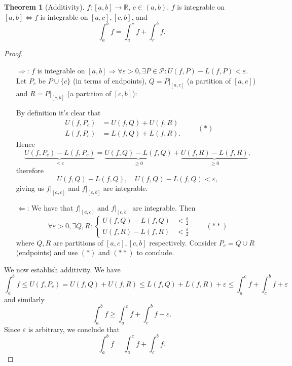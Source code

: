 \documentclass[a4paper]{article}
\theoremstyle{definition}
\newtheorem{thm}[defn]{Theorem}
\begin{document}
\begin{thm}[Additivity]
	$f:[a,b]\rightarrow \mathbb R$, $c\in (a,b)$. $f$ is integrable on $[a,b] \Leftrightarrow f$ is integrable on $[a,c],[c,b]$, and
\[
\int_a^b f = \int_a^c f + \int_c^b f .
\]
\end{thm}
\begin{proof}
	\begin{itemize}
		\item[$\Rightarrow$:] $f$ is integrable on $[a,b] \Rightarrow \forall \varepsilon >0, \exists P\in \mathcal P : U(f,P)-L(f,P) < \varepsilon$. Let $P_c$ be $P \cup \{c\}$ (in terms of endpoints), $Q=\left. P \right|_{[a,c]}$ (a partition of $[a,c]$) and $R=\left. P \right|_{[c,b]}$ (a partition of $[c,b]$):
		\begin{center}
		\end{center}

		By definition it's clear that
\[
\begin{aligned}
			U(f,P_c)&=U(f,Q)+U(f,R) \\ L(f,P_c)&=L(f,Q)+L(f,R).
		\end{aligned} \qquad (\ast)
\]
Hence
\[
\underbrace{U(f,P_c)-L(f,P_c)}_{<\varepsilon} = \underbrace{U(f,Q)-L(f,Q)}_{\geq 0}+\underbrace{U(f,R)-L(f,R)}_{\geq 0},
\]
therefore
\[
U(f,Q)-L(f,Q),\quad U(f,Q)-L(f,Q) < \varepsilon ,
\]
giving us $\left. f \right|_{[a,c]}$ and $\left. f \right|_{[c,b]}$ are integrable.
		\item[$\Leftarrow$:] We have that $\left. f \right|_{[a,c]}$ and $\left. f \right|_{[c,b]}$ are integrable. Then
\[
\forall \varepsilon >0, \exists Q,R : \left\{ \begin{aligned}
			U(f,Q)-L(f,Q) &< \frac{\varepsilon}2 \\ U(f,R)-L(f,R) &< \frac{\varepsilon}2
		\end{aligned} \right. \qquad (\ast\ast)
\]
where $Q,R$ are partitions of $[a,c],[c,b]$ respectively. Consider $P_c=Q\cup R$ (endpoints) and use $(\ast)$ and $(\ast\ast)$ to conclude.
	\end{itemize}

	We now establish additivity. We have
\[
\int_a^b f \leq U(f,P_c) = U(f,Q)+U(f,R) \leq L(f,Q)+L(f,R) + \varepsilon \leq \int_a^c f + \int_c^b f + \varepsilon
\]
and similarly
\[
\int_a^b f \geq \int_a^c f+\int_c^b f - \varepsilon .
\]
Since $\varepsilon$ is arbitrary, we conclude that
\[
\int_a^b f = \int_a^c f + \int_c^b f .
\]
\end{proof}
\end{document}
